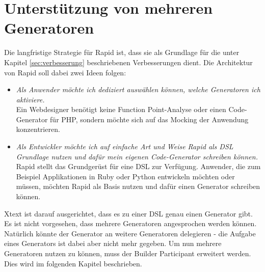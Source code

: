 \documentclass[a4paper,12pt]{scrreprt}
\begin{document}
\section{Unterstützung von mehreren Generatoren}
Die langfristige Strategie für Rapid ist, dass sie als Grundlage für die unter Kapitel \ref{sec:verbesserung} beschriebenen Verbesserungen dient.
Die Architektur von Rapid soll dabei zwei Ideen folgen:
\begin{itemize}
	\item \emph{Als Anwender möchte ich dediziert auswählen können, welche Generatoren ich aktiviere.}\\ Ein Webdesigner benötigt keine Function Point-Analyse oder einen Code-Generator für PHP, sondern möchte sich auf das Mocking der Anwendung konzentrieren.
	\item \emph{Als Entwickler möchte ich auf einfache Art und Weise Rapid als DSL Grundlage nutzen und dafür mein eigenen Code-Generator schreiben können.}\\
	Rapid stellt das Grundgerüst für eine DSL zur Verfügung. Anwender, die zum Beispiel Applikationen in Ruby oder Python entwickeln möchten oder müssen, möchten Rapid als Basis nutzen und dafür einen Generator schreiben können.
\end{itemize}
Xtext ist darauf ausgerichtet, dass es zu einer DSL genau einen Generator gibt. Es ist nicht vorgesehen, dass mehrere Generatoren angesprochen werden können. Natürlich könnte der Generator an weitere Generatoren delegieren - die Aufgabe eines Generators ist dabei aber nicht mehr gegeben. Um nun mehrere Generatoren nutzen zu können, muss der Builder Participant erweitert werden. Dies wird im folgenden Kapitel beschrieben.
\end{document}
